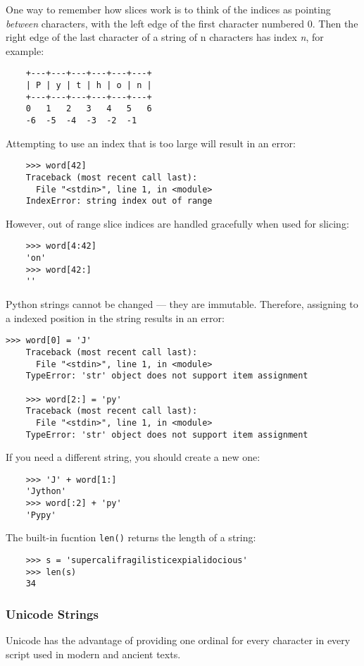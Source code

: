 \documentclass[UTF8]{article}
\begin{document}
One way to remember how slices work is to think of the indices as pointing \emph{between}
characters, with the left edge of the first character numbered 0. Then the right edge of the last
character of a string of n characters has index \emph{n}, for example:
\begin{verbatim}
    +---+---+---+---+---+---+
    | P | y | t | h | o | n |
    +---+---+---+---+---+---+
    0   1   2   3   4   5   6
    -6  -5  -4  -3  -2  -1
\end{verbatim}

Attempting to use an index that is too large will result in an error:
\begin{verbatim}
    >>> word[42]
    Traceback (most recent call last):
      File "<stdin>", line 1, in <module>
    IndexError: string index out of range
\end{verbatim}

However, out of range slice indices are handled gracefully when used for slicing:
\begin{verbatim}
    >>> word[4:42]
    'on'
    >>> word[42:]
    ''
\end{verbatim}

Python strings cannot be changed --- they are immutable. Therefore, assigning to a indexed position
in the string results in an error:
\begin{verbatim}
>>> word[0] = 'J'
    Traceback (most recent call last):
      File "<stdin>", line 1, in <module>
    TypeError: 'str' object does not support item assignment

    >>> word[2:] = 'py'
    Traceback (most recent call last):
      File "<stdin>", line 1, in <module>
    TypeError: 'str' object does not support item assignment
\end{verbatim}

If you need a different string, you should create a new one:
\begin{verbatim}
    >>> 'J' + word[1:]
    'Jython'
    >>> word[:2] + 'py'
    'Pypy'
\end{verbatim}

The built-in fucntion \texttt{len()} returns the length of a string:
\begin{verbatim}
    >>> s = 'supercalifragilisticexpialidocious'
    >>> len(s)
    34
\end{verbatim}

\subsubsection{Unicode Strings}
Unicode has the advantage of providing one ordinal for every character in every script used in
modern and ancient texts.
\end{document}
